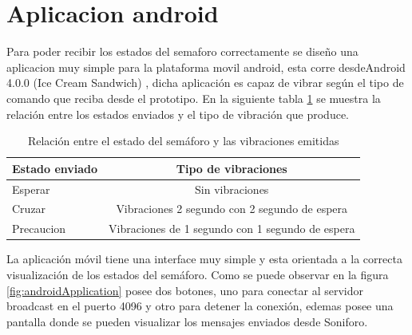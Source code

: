 \section{Aplicacion android}
Para poder recibir los estados del semaforo correctamente se diseño una aplicacion muy simple para la plataforma movil android, esta corre desdeAndroid 4.0.0 (Ice Cream Sandwich) \citep{androidVersion}, dicha aplicación es capaz de vibrar según el tipo de comando que reciba desde el prototipo. En la siguiente tabla \ref{tab:vibraciones} se muestra la relación entre los estados enviados y el tipo de vibración que produce.

\begin{table}[h]
\centering
\caption[caption corto]{Relación entre el estado del semáforo y las vibraciones emitidas}
\begin{tabular}{l c}
\toprule
\textbf{Estado enviado} & \textbf{Tipo de vibraciones}\\
\midrule
Esperar & Sin vibraciones\\
Cruzar &  Vibraciones 2 segundo con 2 segundo de espera\\
Precaucion & Vibraciones de 1 segundo con 1 segundo de espera\\
\bottomrule
\hline
\end{tabular}
\label{tab:vibraciones}
\end{table}

La aplicación móvil tiene una interface muy simple y esta orientada a la correcta visualización de los estados del semáforo. Como se puede observar en la figura \ref{fig:androidApplication} posee dos botones, uno para conectar al servidor broadcast en el puerto 4096 y otro para detener la conexión, edemas posee  una pantalla donde se pueden visualizar los mensajes enviados desde Soniforo.

